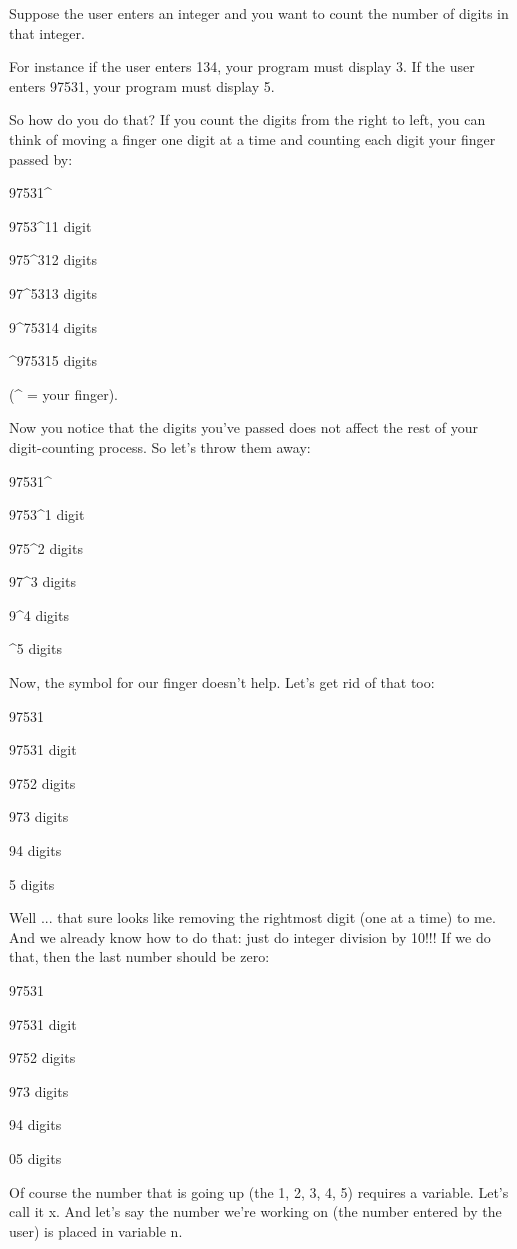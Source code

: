 \documentclass[
]{article}
\begin{document}
Suppose the user enters an integer and you want to count the number of
digits in that integer.

For instance if the user enters 134, your program must display 3. If the
user enters 97531, your program must display 5.

So how do you do that? If you count the digits from the right to left,
you can think of moving a finger one digit at a time and counting each
digit your finger passed by:

97531\^{}

9753\^{}11 digit

975\^{}312 digits

97\^{}5313 digits

9\^{}75314 digits

\^{}975315 digits

(\^{} = your finger).

Now you notice that the digits you've passed does not affect the rest of
your digit-counting process. So let's throw them away:

97531\^{}

9753\^{}1 digit

975\^{}2 digits

97\^{}3 digits

9\^{}4 digits

\^{}5 digits

Now, the symbol for our finger doesn't help. Let's get rid of that too:

97531

97531 digit

9752 digits

973 digits

94 digits

5 digits

Well ... that sure looks like removing the rightmost digit (one at a
time) to me. And we already know how to do that: just do integer
division by 10!!! If we do that, then the last number should be zero:

97531

97531 digit

9752 digits

973 digits

94 digits

05 digits

Of course the number that is going up (the 1, 2, 3, 4, 5) requires a
variable. Let's call it x. And let's say the number we're working on
(the number entered by the user) is placed in variable n.
\end{document}

